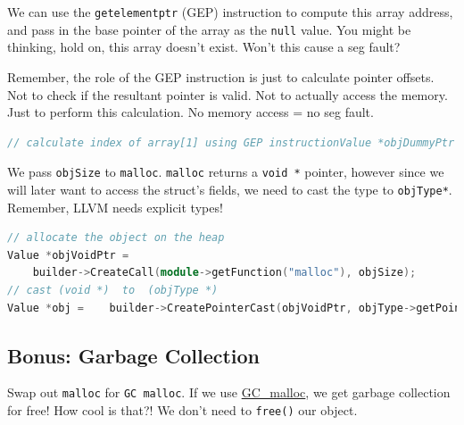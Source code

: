 We can use the \texttt{getelementptr} (GEP) instruction to compute this
array address, and pass in the base pointer of the array as the
\texttt{null} value. You might be thinking, hold on, this array doesn't
exist. Won't this cause a seg fault?

Remember, the role of the GEP instruction is just to calculate pointer
offsets. Not to check if the resultant pointer is valid. Not to actually
access the memory. Just to perform this calculation. No memory access =
no seg fault.

%

\begin{lstlisting}[language=C++,caption={expr\_codegen.cc}]
// calculate index of array[1] using GEP instructionValue *objDummyPtr = builder->CreateConstGEP1_64(    Constant::getNullValue(objType->getPointerTo()), 1, "objsize");// cast to i64 for mallocValue *objSize =    builder->CreatePointerCast(objDummyPtr,Type::getInt64Ty(*context));
\end{lstlisting}

We pass \texttt{objSize} to \texttt{malloc}. \texttt{malloc} returns a
\texttt{void\ *} pointer, however since we will later want to access the
struct's fields, we need to cast the type to \texttt{objType*}.
Remember, LLVM needs explicit types!

%

\begin{lstlisting}[language=C++,caption={expr\_codegen.cc}]
// allocate the object on the heap
Value *objVoidPtr =
    builder->CreateCall(module->getFunction("malloc"), objSize);
// cast (void *)  to  (objType *)
Value *obj =    builder->CreatePointerCast(objVoidPtr, objType->getPointerTo());
\end{lstlisting}

\hypertarget{bonus-garbage-collection}{%
\subsection{\texorpdfstring{\protect\hyperlink{bonus-garbage-collection}{}Bonus:
Garbage
Collection}{Bonus: Garbage Collection}}\label{bonus-garbage-collection}}

Swap out \texttt{malloc} for \texttt{GC\ malloc}. If we use
\href{https://linux.die.net/man/3/gc}{GC\_malloc}, we get garbage
collection for free! How cool is that?! We don't need to \texttt{free()}
our object.


